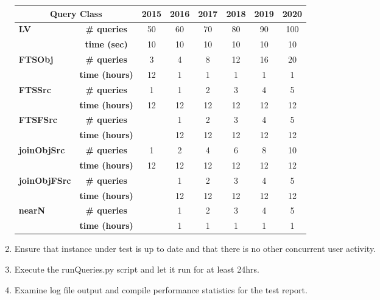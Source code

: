 \begin{enumerate}
{    \begin{tabular}{|l|c|c|c|c|c|c|c|}\hline
      \multicolumn{2}{|c|}{\textbf{Query Class}}
        &\textbf{2015}&\textbf{2016}&\textbf{2017}&\textbf{2018}&\textbf{2019}&\textbf{2020}\\\hline
      \multirow{2}{*}{\textbf{LV}}
        &\textbf{\# queries}  & 50 & 60 & 70 & 80 & 90 & 100 \\%
        &\textbf{time (sec)}  & 10 & 10 & 10 & 10 & 10 &  10 \\\hline
      \multirow{2}{*}{\textbf{FTSObj}}
        &\textbf{\# queries}  &  3 &  4 &  8 & 12 & 16 &  20 \\%
        &\textbf{time (hours)}& 12 &  1 &  1 &  1 &  1 &   1 \\\hline                     
      \multirow{2}{*}{\textbf{FTSSrc}}
        &\textbf{\# queries}  &  1 &  1 &  2 &  3 &  4 &   5 \\%
        &\textbf{time (hours)}& 12 & 12 & 12 & 12 & 12 &  12 \\\hline                     
      \multirow{2}{*}{\textbf{FTSFSrc}}
        &\textbf{\# queries}  &    &  1 &  2 &  3 &  4 &   5 \\%
        &\textbf{time (hours)}&    & 12 & 12 & 12 & 12 &  12 \\\hline                     
      \multirow{2}{*}{\textbf{joinObjSrc}}
        &\textbf{\# queries}  &  1 &  2 &  4 &  6 &  8 &  10 \\%
        &\textbf{time (hours)}& 12 & 12 & 12 & 12 & 12 &  12 \\\hline                     
      \multirow{2}{*}{\textbf{joinObjFSrc}}
        &\textbf{\# queries}  &    &  1 &  2 &  3 &  4 &   5 \\%
        &\textbf{time (hours)}&    & 12 & 12 & 12 & 12 &  12 \\\hline                     
      \multirow{2}{*}{\textbf{nearN}}
        &\textbf{\# queries}  &    &  1 &  2 &  3 &  4 &   5 \\%
        &\textbf{time (hours)}&    &  1 &  1 &  1 &  1 &   1 \\\hline                     
    \end{tabular}

  }

  \item{Ensure that \product{} instance under test is up to date and that there is no other concurrent
  user activity.}

  \item{Execute the runQueries.py script and let it run for at least 24hrs.}

  \item{Examine log file output and compile performance statistics for the test report.}

\end{enumerate}

